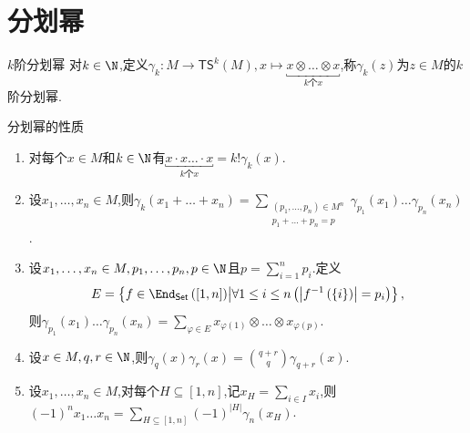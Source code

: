 \section{分划幂}

\begin{definition}{$k$阶分划幂}{}
	对$k\in\N$,定义$\gamma_{k}:M\to\mathsf{TS}^{k}\left(M\right),x\mapsto\underbracket{x\otimes\ldots\otimes x}_{k\text{个}x}$,称$\gamma_{k}\left(z\right)$为$z\in M$的$k$阶分划幂.
\end{definition}

\begin{proposition}{分划幂的性质}{}
	\begin{enumerate}
		\item 对每个$x\in M$和$k\in\N$有$\underbracket{x\cdot x\ldots\cdot x}_{k\text{个}x}=k!\gamma_{k}\left(x\right)$.
		\item 设$x_{1},\ldots,x_{n}\in M$,则$\gamma_{k}\left(x_{1}+\ldots+x_{n}\right)=\sum\limits_{\substack{\left(p_{1},\ldots,p_{n}\right)\in M^{n}\\p_{1}+\ldots+p_{n}=p}}\gamma_{p_{1}}\left(x_{1}\right)\ldots\gamma_{p_{n}}\left(x_{n}\right)$.
		\item 设$x_{1},\ldots,x_{n}\in M,p_{1},\ldots,p_{n},p\in\N$且$p=\sum\limits_{i=1}^{n}p_{i}$.定义
		\begin{align*}
			E=\left\{f\in\End_{\mathsf{Set}}\left(\left[1,n\right]\right)\middle|\forall 1\leq i\leq n\left(\left|f^{-1}\left(\left\{i\right\}\right)\right|=p_{i}\right)\right\},
		\end{align*}
		则$\gamma_{p_{1}}\left(x_{1}\right)\ldots\gamma_{p_{n}}\left(x_{n}\right)=\sum\limits_{\varphi\in E}x_{\varphi\left(1\right)}\otimes\ldots\otimes x_{\varphi\left(p\right)}$.
		\item 设$x\in M,q,r\in\N$,则$\gamma_{q}\left(x\right)\gamma_{r}\left(x\right)=\binom{q+r}{q}\gamma_{q+r}\left(x\right)$.
		\item 设$x_{1},\ldots,x_{n}\in M$,对每个$H\subseteq\left[1,n\right]$,记$x_{H}=\sum\limits_{i\in I}x_{i}$,则$\left(-1\right)^{n}x_{1}\ldots x_{n}=\sum\limits_{H\subseteq\left[1,n\right]}\left(-1\right)^{\left|H\right|}\gamma_{n}\left(x_{H}\right)$.
	\end{enumerate}
\end{proposition}

